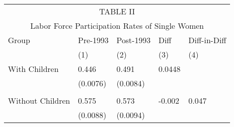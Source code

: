 

\begin{tabular}[H]{ |p{4cm}||p{2cm}|p{2cm}|p{2cm}| p{2cm}|}
 \hline
 \multicolumn{5}{|c|}{TABLE II} \\
 \multicolumn{5}{|c|}{Labor Force Participation Rates of Single Women} \\
 \hline
  Group &Pre-1993&Post-1993 & Diff & Diff-in-Diff\\
  & (1) & (2) & (3) & (4)\\
 \hline
With Children    &0.446 &0.491 &0.0448 & \\
& (0.0076) & (0.0084) &&\\
&&&&\\
Without Children  & 0.575 & 0.573 & -0.002 & 0.047 \\
& (0.0088) & (0.0094) &&\\


\hline
\end{tabular}

